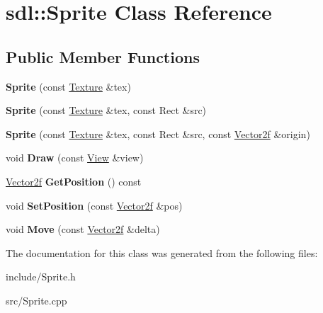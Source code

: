 \hypertarget{classsdl_1_1Sprite}{\section{sdl\-:\-:Sprite Class Reference}
\label{classsdl_1_1Sprite}
}
\subsection*{Public Member Functions}
\begin{DoxyCompactItemize}
\item 
\hypertarget{classsdl_1_1Sprite_af75e3f2937ead5f87c59ac7ece35f0b5}{{\bfseries Sprite} (const \hyperlink{classsdl_1_1Texture}{Texture} \&tex)}\label{classsdl_1_1Sprite_af75e3f2937ead5f87c59ac7ece35f0b5}

\item 
\hypertarget{classsdl_1_1Sprite_af18d1140f3693958ee39eb21e6f021de}{{\bfseries Sprite} (const \hyperlink{classsdl_1_1Texture}{Texture} \&tex, const Rect \&src)}\label{classsdl_1_1Sprite_af18d1140f3693958ee39eb21e6f021de}

\item 
\hypertarget{classsdl_1_1Sprite_a7eaf33417082f9e8c1d26f6fe99a7c9b}{{\bfseries Sprite} (const \hyperlink{classsdl_1_1Texture}{Texture} \&tex, const Rect \&src, const \hyperlink{classsdl_1_1Vector2f}{Vector2f} \&origin)}\label{classsdl_1_1Sprite_a7eaf33417082f9e8c1d26f6fe99a7c9b}

\item 
\hypertarget{classsdl_1_1Sprite_af33f5e27e3f8ab93b88d5f6ed54c4bae}{void {\bfseries Draw} (const \hyperlink{classsdl_1_1View}{View} \&view)}\label{classsdl_1_1Sprite_af33f5e27e3f8ab93b88d5f6ed54c4bae}

\item 
\hypertarget{classsdl_1_1Sprite_a86e776ca7e617431f238a2e2906ab2ec}{\hyperlink{classsdl_1_1Vector2f}{Vector2f} {\bfseries Get\-Position} () const }\label{classsdl_1_1Sprite_a86e776ca7e617431f238a2e2906ab2ec}

\item 
\hypertarget{classsdl_1_1Sprite_a522f30132445096e053719519706bf04}{void {\bfseries Set\-Position} (const \hyperlink{classsdl_1_1Vector2f}{Vector2f} \&pos)}\label{classsdl_1_1Sprite_a522f30132445096e053719519706bf04}

\item 
\hypertarget{classsdl_1_1Sprite_a13db2ead8973ccbc725216bc62a31b0c}{void {\bfseries Move} (const \hyperlink{classsdl_1_1Vector2f}{Vector2f} \&delta)}\label{classsdl_1_1Sprite_a13db2ead8973ccbc725216bc62a31b0c}

\end{DoxyCompactItemize}


The documentation for this class was generated from the following files\-:\begin{DoxyCompactItemize}
\item 
include/Sprite.\-h\item 
src/Sprite.\-cpp\end{DoxyCompactItemize}
